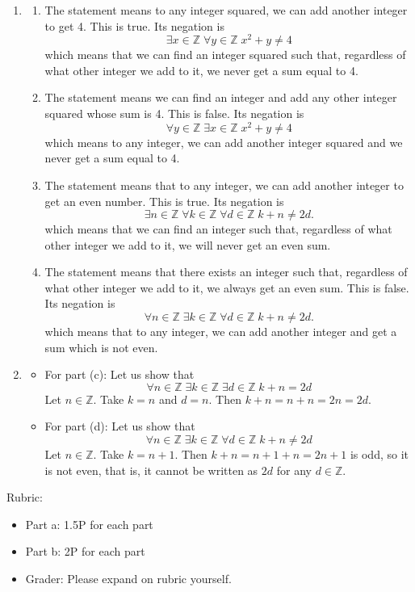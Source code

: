 \documentclass{article}
\newcommand{\Z}{\mathbb{Z}}
\theoremstyle{definition}
\begin{document}
\begin{solution}
\begin{enumerate}
	\item 
	\begin{enumerate}
		\item The statement means to any integer squared, we can add another integer to get 4. This is true. Its negation is
		\[
		\exists x \in \Z \; \forall y \in \Z \; x^2 + y \neq 4
		\]
		which means that we can find an integer squared such that, regardless of what other integer we add to it, we never get a sum equal to 4. 
		
		\item The statement means we can find an integer and add any other integer squared whose sum is 4. This is false. Its negation is
		\[
		\forall y \in \Z \; \exists x \in \Z \; x^2 + y \neq 4
		\]
		which means to any integer, we can add another integer squared and we never get a sum equal to 4.
		
		
		\item The statement means that to any integer, we can add another integer to get an even number. This is true. Its negation is
		\[
		\exists n \in \Z \; \forall k \in \Z \; \forall d \in \Z \; k + n \neq 2d.
		\]
		which means that we can find an integer such that, regardless of what other integer we add to it, we will never get an  even sum.
		
		\item The statement means that there exists an integer such that, regardless of what other integer we add to it, we always get an even sum. This is false. Its negation is
		\[
		\forall n \in \Z \; \exists k \in \Z \; \forall d \in \Z \; k + n \neq 2d.
		\]
		which means that to any integer, we can add another integer and get a sum which is not even.
		
	\end{enumerate}
	\item \begin{itemize}
		\item For part (c): Let us show that
		\[
		\forall n \in \Z \; \exists k \in \Z \; \exists d \in \Z \; k + n = 2d
		\]
		Let $n \in \Z$. Take $k = n$ and $d = n$. Then $k+n = n + n = 2n = 2d$.
		
		\item For part (d): Let us show that
		\[
		\forall n \in \Z \; \exists k \in \Z \; \forall d \in \Z \; k + n \neq 2d
		\]
		Let $n \in \Z$. Take $k = n + 1$. Then $k + n = n+1+n = 2n + 1$ is odd, so it is not even, that is, it cannot be written as $2d$ for any $d \in \Z$.
		
	\end{itemize}
	
\end{enumerate}

{\color{red} Rubric:
\begin{itemize}
\item Part a: 1.5P for each part
\item Part b: 2P for each part
\item Grader: Please expand on rubric yourself.
\end{itemize}}
\end{solution}
\end{document}
